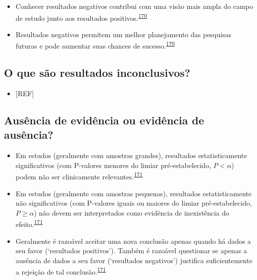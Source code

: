 \documentclass[
  a4paper,
]{book}
\providecommand{\tightlist}{%
  \setlength{\itemsep}{0pt}\setlength{\parskip}{0pt}}
\begin{document}
\begin{itemize}
\item
  Conhecer resultados negativos contribui com uma visão mais ampla do campo de estudo junto aos resultados positivos.\textsuperscript{\protect\hyperlink{ref-weintraub2016}{170}}
\item
  Resultados negativos permitem um melhor planejamento das pesquisas futuras e pode aumentar suas chances de sucesso.\textsuperscript{\protect\hyperlink{ref-weintraub2016}{170}}
\end{itemize}

\hypertarget{o-que-suxe3o-resultados-inconclusivos}{%
\subsection{O que são resultados inconclusivos?}\label{o-que-suxe3o-resultados-inconclusivos}}

\begin{itemize}
\tightlist
\item
  {[}REF{]}
\end{itemize}

\hypertarget{ausuxeancia-de-eviduxeancia-ou-eviduxeancia-de-ausuxeancia}{%
\subsection{Ausência de evidência ou evidência de ausência?}\label{ausuxeancia-de-eviduxeancia-ou-eviduxeancia-de-ausuxeancia}}

\begin{itemize}
\item
  Em estudos (geralmente com amostras grandes), resultados estatisticamente significativos (com P-valores menores do limiar pré-estabelecido, \(P<\alpha\)) podem não ser clinicamente relevantes.\textsuperscript{\protect\hyperlink{ref-altman1995}{171}}
\item
  Em estudos (geralmente com amostras pequenas), resultados estatisticamente não significativos (com P-valores iguais ou maiores do limiar pré-estabelecido, \(P≥\alpha\)) não devem ser interpretados como evidência de inexistência do efeito.\textsuperscript{\protect\hyperlink{ref-altman1995}{171}}
\item
  Geralmente é razoável aceitar uma nova conclusão apenas quando há dados a seu favor (`resultados positivos'). Também é razoável questionar se apenas a ausência de dados a seu favor (`resultados negativos') justifica suficientemente a rejeição de tal conclusão.\textsuperscript{\protect\hyperlink{ref-altman1995}{171}}
\end{itemize}
\end{document}
